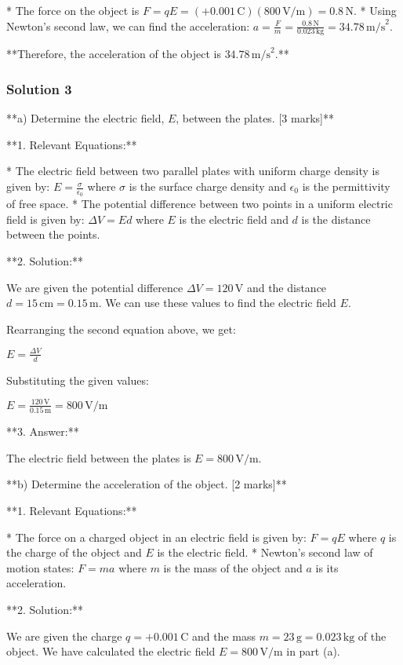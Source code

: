 \documentclass{article}
\begin{document}
*   The force on the object is $F = qE = (+0.001 \, \text{C})(800 \, \text{V/m}) = 0.8 \, \text{N}$.
*   Using Newton's second law, we can find the acceleration: $a = \frac{F}{m} = \frac{0.8 \, \text{N}}{0.023 \, \text{kg}} = 34.78 \, \text{m/s}^2$.

**Therefore, the acceleration of the object is $34.78 \, \text{m/s}^2$.**

\subsubsection{Solution 3}
**a) Determine the electric field, $E$, between the plates. [3 marks]**

**1. Relevant Equations:**

*   The electric field between two parallel plates with uniform charge density is given by: 
    $E = \frac{\sigma}{\epsilon_0}$ 
    where $\sigma$ is the surface charge density and $\epsilon_0$ is the permittivity of free space.
*   The potential difference between two points in a uniform electric field is given by: 
    $\Delta V = Ed$ 
    where $E$ is the electric field and $d$ is the distance between the points.

**2. Solution:**

We are given the potential difference $\Delta V = 120 \, \text{V}$ and the distance $d = 15 \, \text{cm} = 0.15 \, \text{m}$. We can use these values to find the electric field $E$.

Rearranging the second equation above, we get:

$E = \frac{\Delta V}{d}$

Substituting the given values:

$E = \frac{120 \, \text{V}}{0.15 \, \text{m}} = 800 \, \text{V/m}$

**3. Answer:**

The electric field between the plates is $E = 800 \, \text{V/m}$.

**b) Determine the acceleration of the object. [2 marks]**

**1. Relevant Equations:**

*   The force on a charged object in an electric field is given by: 
    $F = qE$ 
    where $q$ is the charge of the object and $E$ is the electric field.
*   Newton's second law of motion states: 
    $F = ma$ 
    where $m$ is the mass of the object and $a$ is its acceleration.

**2. Solution:**

We are given the charge $q = +0.001 \, \text{C}$ and the mass $m = 23 \, \text{g} = 0.023 \, \text{kg}$ of the object. We have calculated the electric field $E = 800 \, \text{V/m}$ in part (a).
\end{document}
